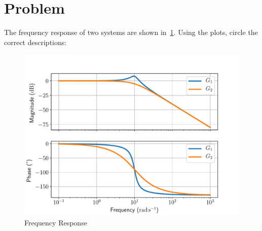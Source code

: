 \documentclass[titlepage, 11pt, reqno]{article}    %
\begin{document}
\begin{figure}[htbp]
\centering
\begin{scaletikzpicturetowidth}{0.8\textwidth}
\end{scaletikzpicturetowidth}
\end{figure}

\clearpage
\section{Problem}\label{prob:bode_response_analysis}

The frequency response of two systems are shown in~\cref{fig:prob1_bode}.
Using the plots, circle the correct descriptions:
\begin{figure}[htbp]
    \centering
    \includegraphics[width=\textwidth, height=0.6\textheight, keepaspectratio]{figures/prob1_bode.pdf}
    \caption{Frequency Response~\label{fig:prob1_bode}}
\end{figure}  
\end{document}

